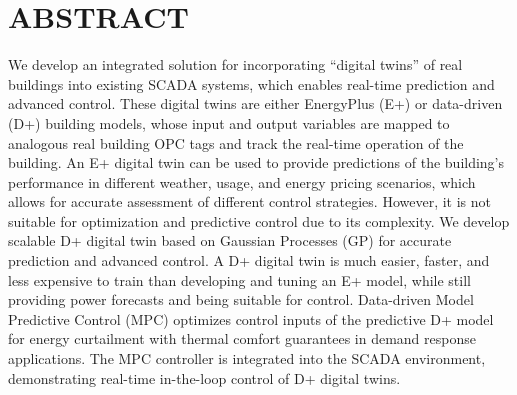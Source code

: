\section{ABSTRACT}

We develop an integrated solution for incorporating ``digital twins” of real buildings into existing SCADA systems, which enables real-time prediction and advanced control. 
These digital twins are either EnergyPlus (E+) or data-driven (D+) building models, whose input and output variables are mapped to analogous real building OPC tags and track the real-time operation of the building.
An E+ digital twin can be used to provide predictions of the building’s performance in different weather, usage, and energy pricing scenarios, which allows for accurate assessment of different control strategies. 
However, it is not suitable for optimization and predictive control due to its complexity. 
We develop scalable D+ digital twin based on Gaussian Processes (GP) for accurate prediction and advanced control. 
A D+ digital twin is much easier, faster, and less expensive to train than developing and tuning an E+ model, while still providing power forecasts and being suitable for control. 
Data-driven Model Predictive Control (MPC) optimizes control inputs of the predictive D+ model for energy curtailment with thermal comfort guarantees in demand response applications.
The MPC controller is integrated into the SCADA environment, demonstrating real-time in-the-loop control of D+ digital twins.
